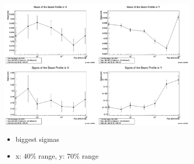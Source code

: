 \documentclass[9pt]{beamer}
\begin{document}
\begin{frame}
	\begin{center}
		\includegraphics[width=10cm]{BeamProfileOverview2}
	\end{center}
	\begin{itemize}
		\item biggest sigmas
		\item x: 40\% range, y: 70\% range
	\end{itemize}
\end{frame}
\end{document}
